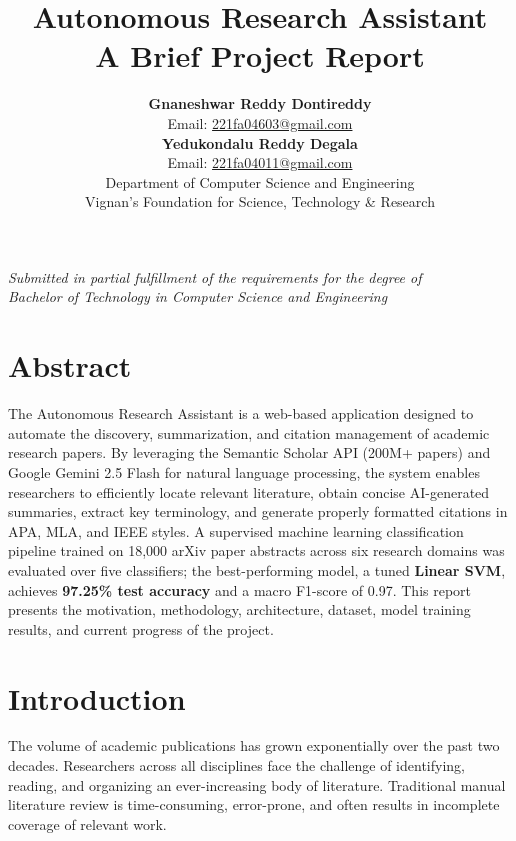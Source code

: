\documentclass[12pt,a4paper]{article}
\title{\textbf{Autonomous Research Assistant} \\ \large A Brief Project Report}
\author{
  \textbf{Gnaneshwar Reddy Dontireddy} \\
  Email: \href{mailto:221fa04603@gmail.com}{221fa04603@gmail.com} \\[6pt]
  \textbf{Yedukondalu Reddy Degala} \\
  Email: \href{mailto:221fa04011@gmail.com}{221fa04011@gmail.com} \\[12pt]
  Department of Computer Science and Engineering \\
  Vignan's Foundation for Science, Technology \& Research
}
\date{}
\begin{document}
\maketitle
\thispagestyle{empty}

\vfill
\begin{center}
  \textit{Submitted in partial fulfillment of the requirements for the degree of} \\
  \textit{Bachelor of Technology in Computer Science and Engineering}
\end{center}
\newpage

\setcounter{page}{1}

\section{Abstract}

The Autonomous Research Assistant is a web-based application designed to automate the discovery, summarization, and citation management of academic research papers. By leveraging the Semantic Scholar API (200M+ papers) and Google Gemini 2.5 Flash for natural language processing, the system enables researchers to efficiently locate relevant literature, obtain concise AI-generated summaries, extract key terminology, and generate properly formatted citations in APA, MLA, and IEEE styles. A supervised machine learning classification pipeline trained on 18,000 arXiv paper abstracts across six research domains was evaluated over five classifiers; the best-performing model, a tuned \textbf{Linear SVM}, achieves \textbf{97.25\% test accuracy} and a macro F1-score of 0.97. This report presents the motivation, methodology, architecture, dataset, model training results, and current progress of the project.

\section{Introduction}

The volume of academic publications has grown exponentially over the past two decades. Researchers across all disciplines face the challenge of identifying, reading, and organizing an ever-increasing body of literature. Traditional manual literature review is time-consuming, error-prone, and often results in incomplete coverage of relevant work.
\end{document}
